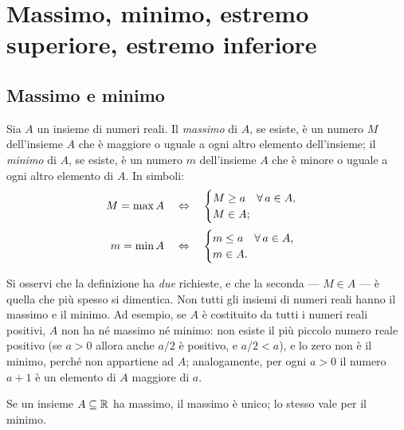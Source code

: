 \section{Massimo, minimo, estremo superiore, estremo inferiore}
\label{sec:sup}

\subsection{Massimo e minimo}

\begin{definizione}
Sia $A$ un insieme di numeri reali. Il \emph{massimo} di $A$, se esiste, è un numero
$M$ dell'insieme $A$ che è maggiore o uguale a ogni altro elemento dell'insieme; il
\emph{minimo} di $A$, se esiste, è un numero $m$ dell'insieme $A$ che è minore o uguale a
ogni altro elemento di $A$. In simboli:
\begin{align}
  M=\max A \quad&\Leftrightarrow\quad \begin{cases} M\ge a \quad \forall\, a\in A,\\ M\in A;\end{cases}
  \label{eq:max-def}\\[2pt]
  m=\min A \quad&\Leftrightarrow\quad \begin{cases} m\le a \quad \forall\, a\in A,\\ m\in A.\end{cases}
  \label{eq:min-def}
\end{align}
\end{definizione}

Si osservi che la definizione ha \emph{due} richieste, e che la seconda --- $M\in A$ ---
è quella che più spesso si dimentica. Non tutti gli insiemi di numeri reali hanno il
massimo e il minimo. Ad esempio, se $A$ è costituito da tutti i numeri reali positivi,
$A$ non ha né massimo né minimo: non esiste il più piccolo numero reale positivo (se $a>0$
allora anche $a/2$ è positivo, e $a/2<a$), e lo zero non è il minimo, perché non
appartiene ad $A$; analogamente, per ogni $a>0$ il numero $a+1$ è un elemento di $A$
maggiore di $a$.

\begin{proposizione}\label{prop:unicita-max}
Se un insieme $A\subseteq\mathbb{R}$ ha massimo, il massimo è unico; lo stesso vale per il minimo.
\end{proposizione}

